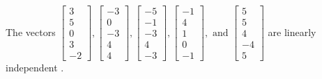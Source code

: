 \begin{exercise}
\begin{exerciseStatement}
  \end{exerciseStatement}
  \begin{exerciseAnswer}
   The vectors \(\left[\begin{array}{r}
3 \\
5 \\
0 \\
3 \\
-2
\end{array}\right] , \left[\begin{array}{r}
-3 \\
0 \\
-3 \\
4 \\
4
\end{array}\right] , \left[\begin{array}{r}
-5 \\
-1 \\
-3 \\
4 \\
-3
\end{array}\right] , \left[\begin{array}{r}
-1 \\
4 \\
1 \\
0 \\
-1
\end{array}\right] , \text{ and } \left[\begin{array}{r}
5 \\
5 \\
4 \\
-4 \\
5
\end{array}\right]\) are 
  	 linearly independent  .
  


  \end{exerciseAnswer}
\end{exercise}